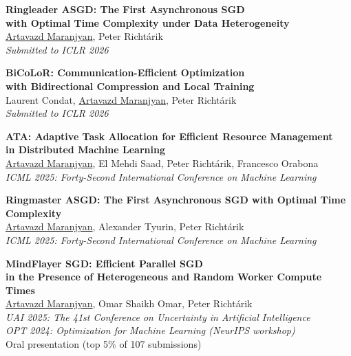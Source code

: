 \documentclass[10pt,a4paper,sans]{moderncv}        %
\newcommand{\red}{\color{cherry}}
\newcommand{\highlight}[1]{{\red #1}}
\begin{document}
\begin{etaremune}

\item \textbf{Ringleader ASGD: The First Asynchronous SGD \\ with Optimal Time Complexity under Data Heterogeneity}\\
\underline{Artavazd Maranjyan}, Peter Richtárik\\
\textit{Submitted to ICLR 2026}

\item \textbf{BiCoLoR: Communication-Efficient Optimization \\ with Bidirectional Compression and Local Training}\\
Laurent Condat, \underline{Artavazd Maranjyan}, Peter Richtárik\\
\textit{Submitted to ICLR 2026}

\item \textbf{ATA: Adaptive Task Allocation for Efficient Resource Management \\ in Distributed Machine Learning}\\
\underline{Artavazd Maranjyan}, El Mehdi Saad, Peter Richtárik, Francesco Orabona\\
\textit{ICML 2025: Forty-Second International Conference on Machine Learning}

\item \textbf{Ringmaster ASGD: The First Asynchronous SGD with Optimal Time Complexity}\\
\underline{Artavazd Maranjyan}, Alexander Tyurin, Peter Richtárik\\
\textit{ICML 2025: Forty-Second International Conference on Machine Learning}

\item \textbf{MindFlayer SGD: Efficient Parallel SGD \\ in the Presence of Heterogeneous and Random Worker Compute Times}\\
\underline{Artavazd Maranjyan}, Omar Shaikh Omar, Peter Richtárik\\
\textit{UAI 2025: The 41st Conference on Uncertainty in Artificial Intelligence}\\
\textit{OPT 2024: Optimization for Machine Learning (NeurIPS workshop)}\\
\highlight{Oral presentation (top 5\% of 107 submissions)}


\end{etaremune}
\end{document}
